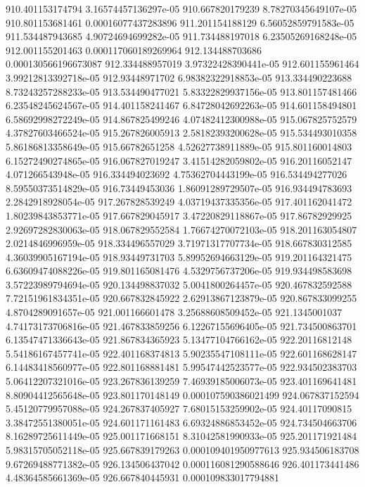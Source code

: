 {910.401153174794 3.16574457136297e-05
910.667820179239 8.78270345649107e-05
910.801153681461 0.00016077437283896
911.201154188129 6.56052859791583e-05
911.534487943685 4.90724694699282e-05
911.734488197018 6.23505269168248e-05
912.001155201463 0.000117060189269964
912.134488703686 0.000130566196673087
912.334488957019 3.97322428390441e-05
912.601155961464 3.99212813392718e-05
912.93448971702 6.98382322918853e-05
913.334490223688 8.73243257288233e-05
913.534490477021 5.83322829937156e-05
913.801157481466 6.23548245624567e-05
914.401158241467 6.84728042692263e-05
914.601158494801 6.58692998272249e-05
914.867825499246 4.07482412300988e-05
915.067825752579 4.37827603466524e-05
915.267826005913 2.58182393200628e-05
915.534493010358 5.86186813358649e-05
915.66782651258 4.52627738911889e-05
915.801160014803 6.15272490274865e-05
916.067827019247 3.41514282059802e-05
916.20116052147 4.071266543948e-05
916.334494023692 4.75362704443199e-05
916.534494277026 8.59550373514829e-05
916.73449453036 1.86091289729507e-05
916.934494783693 2.2842918928054e-05
917.267828539249 4.03719437335356e-05
917.401162041472 1.80239843853771e-05
917.667829045917 3.47220829118867e-05
917.86782929925 2.92697282830063e-05
918.067829552584 1.76674270072103e-05
918.201163054807 2.0214846996959e-05
918.334496557029 3.71971317707734e-05
918.667830312585 4.36039905167194e-05
918.93449731703 5.89952694663129e-05
919.201164321475 6.63609474088226e-05
919.801165081476 4.5329756737206e-05
919.934498583698 3.57223989794694e-05
920.134498837032 5.0041800264457e-05
920.467832592588 7.72151961834351e-05
920.667832845922 2.62913867123879e-05
920.867833099255 4.8704289091657e-05
921.001166601478 3.25688608509452e-05
921.1345001037 4.74173173706816e-05
921.467833859256 6.12267155696405e-05
921.734500863701 6.13547471336643e-05
921.867834365923 5.13477104766162e-05
922.20116812148 5.54186167457741e-05
922.401168374813 5.90235547108111e-05
922.601168628147 6.14483418560977e-05
922.801168881481 5.99547442523577e-05
922.934502383703 5.06412207321016e-05
923.267836139259 7.46939185006073e-05
923.401169641481 8.80904412565648e-05
923.801170148149 0.000107590386021499
924.067837152594 5.45120779957088e-05
924.267837405927 7.68015153259902e-05
924.40117090815 3.38472551380051e-05
924.601171161483 6.69324886853452e-05
924.734504663706 8.16289725611449e-05
925.001171668151 8.31042581990933e-05
925.201171921484 5.98315705052118e-05
925.667839179263 0.000109401950977613
925.934506183708 9.67269488771382e-05
926.134506437042 0.000116081290588646
926.401173441486 4.48364585661369e-05
926.667840445931 0.000109833017794881
}
